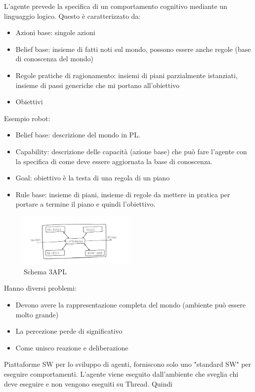 \begin{esempio}
    L'agente prevede la specifica di un comportamento cognitivo mediante un
    linguaggio logico. Questo è caratterizzato da:
    \begin{itemize}
        \item Azioni base: singole azioni
        \item Belief base: insieme di fatti noti sul mondo, possono essere anche
              regole (base di conoscenza del mondo)
        \item Regole pratiche di ragionamento: insiemi di piani parzialmente istanziati,
              insieme di passi generiche che mi portano all'obiettivo
        \item Obiettivi
    \end{itemize}
    Esempio robot:
    \begin{itemize}
        \item Belief base: descrizione del mondo in PL.
        \item Capability: descrizione delle capacità (azione base) che può fare
              l'agente con la specifica di come deve essere aggiornata la base
              di conoscenza.
        \item Goal: obiettivo è la testa di una regola di un piano
        \item Rule base: insieme di piani, insieme di regole da mettere in pratica
              per portare a termine il piano e quindi l'obiettivo.
    \end{itemize}

    \begin{figure}[!h]
        \centering
        \includegraphics[width=0.50\textwidth]{./img/Agenti/3APL.jpg}
        \caption{Schema 3APL}
        \label{fig:3APL}
    \end{figure}

    Hanno diversi problemi:
    \begin{itemize}
        \item Devono avere la rappresentazione completa del mondo (ambiente può
              essere molto grande)
        \item La percezione perde di significativo
        \item Come unisco reazione e deliberazione
    \end{itemize}
\end{esempio}
\begin{esempio} 
    Piattaforme SW per lo sviluppo di agenti, forniscono solo uno "standard SW"
    per eseguire comportamenti. L'agente viene eseguito dall'ambiente che sveglia
    chi deve eseguire e non vengono eseguiti su Thread. Quindi
\end{esempio}

